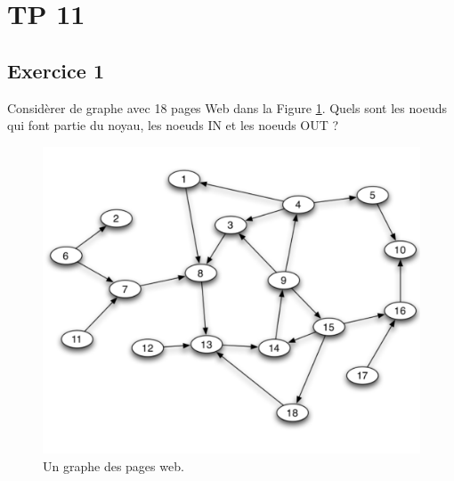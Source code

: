 \section{TP 11}









\subsection*{Exercice 1}
Considèrer de graphe avec 18 pages Web dans la Figure \ref{fig:webg}. Quels sont les noeuds qui font partie du noyau, les noeuds IN et les noeuds
OUT ? 

    \begin{figure}[h!]
    \begin{center}
    \includegraphics[scale = 0.3]{figs/graph.png}
    \end{center}
    \caption{Un graphe des pages web.}
    \label{fig:webg}
    \end{figure}

